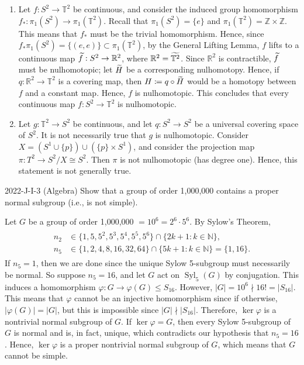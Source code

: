 \documentclass{article}
\begin{document}
\begin{solutions}
	\vspace{-0.35cm}
	\begin{enumerate}[itemsep =-2pt,label = (\alph{*})]
		\item Let $f: S^{2} \to \mathbb{T}^{2}$ be continuous, and consider the induced group homomorphism $f_{\ast}: \pi_{1}(S^{2}) \to \pi_{1}(\mathbb{T}^{2})$. Recall that $\pi_{1}(S^{2}) = \{e\}$ and $\pi_{1}(\mathbb{T}^{2}) = \mathbb{Z} \times \mathbb{Z}$. This means that $f_{\ast}$ must be the trivial homomorphism. Hence, since $f_{\ast}\pi_{1}(S^{2}) = \{(e,e)\} \subset \pi_{1}(\mathbb{T}^{2})$, by the General Lifting Lemma, $f$ lifts to a continuous map $\widetilde{f}: S^{2} \to \mathbb{R}^{2}$, where $\mathbb{R}^{2} = \widetilde{\mathbb{T}^{2}}$. Since $\mathbb{R}^{2}$ is contractible, $\widetilde{f}$ must be nulhomotopic; let $\widetilde{H}$ be a corresponding nulhomotopy. Hence, if $q: \mathbb{R}^{2} \to \mathbb{T}^{2}$ is a covering map, then $H \coloneqq q\circ \widetilde{H}$ would be a homotopy between $f$ and a constant map. Hence, $f$ is nulhomotopic. This concludes that every continuous map $f: S^{2} \to \mathbb{T}^{2}$ is nulhomotopic. 
		\item Let $g: \mathbb{T}^{2} \to S^{2}$ be continuous, and let $q: S^{2} \to S^{2}$ be a universal covering space of $S^{2}$. It is not necessarily true that $g$ is nulhomotopic. Consider $X = (S^{1} \cup \{p\}) \cup (\{p\}\times S^{1})$, and consider the projection map $\pi: T^{2} \to S^{2}/X \cong S^{2}$. Then $\pi$ is not nulhomotopic (has degree one). Hence, this statement is not generally true.  
	\end{enumerate}
\end{solutions} 
\begin{prb}{2022-J-I-3 (Algebra)}
	Show that a group of order 1,000,000 contains a proper normal subgroup (i.e., is not simple). 
\end{prb}
\begin{solutions}
	Let $G$ be a group of order 1,000,000 $=10^{6} = 2^{6} \cdot 5^{6}$. By Sylow's Theorem, 
	\begin{align}
		\begin{split}
			n_{2} &\in \{1, 5, 5^{2}, 5^{3}, 5^{4}, 5^{5}, 5^{6}\} \cap \{2k + 1: k \in \mathbb{N}\}, \\
			n_{5} &\in \{1, 2, 4, 8, 16, 32, 64\} \cap \{5k + 1: k \in \mathbb{N}\} = \{1, 16\}. 
		\end{split}
	\end{align}
	If $n_{5} = 1$, then we are done since the unique Sylow 5-subgroup must necessarily be normal. So suppose $n_{5} = 16$, and let $G$ act on $\operatorname{Syl}_{5}(G)$ by conjugation. This induces a homomorphism $\varphi: G \to \varphi(G) \leq S_{16}$. However, $|G| = 10^{6} \nmid 16! = |S_{16}|$. This means that $\varphi$ cannot be an injective homomorphism since if otherwise, $|\varphi(G)| = |G|$, but this is impossible since $|G| \nmid |S_{16}|$. Therefore, $\ker{\varphi}$ is a nontrivial normal subgroup of $G$. If $\ker{\varphi} = G$, then every Sylow 5-subgroup of $G$ is normal and is, in fact, unique, which contradicts our hypothesis that $n_{5} = 16$. Hence, $\ker{\varphi}$ is a proper nontrivial normal subgroup of $G$, which means that $G$ cannot be simple. 
\end{solutions}
\end{document}
